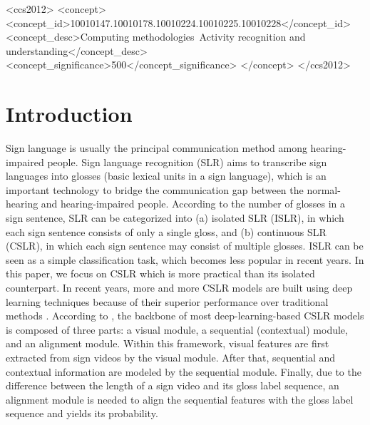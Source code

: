 \documentclass[acmsmall,screen]{acmart}
\begin{document}
\begin{CCSXML}
<ccs2012>
<concept>
<concept_id>10010147.10010178.10010224.10010225.10010228</concept_id>
<concept_desc>Computing methodologies~Activity recognition and understanding</concept_desc>
<concept_significance>500</concept_significance>
</concept>
</ccs2012>
\end{CCSXML}



\maketitle

\section{Introduction}
\label{sec:intro}
Sign language is usually the principal communication method among hearing-impaired people.
Sign language recognition (SLR) aims to transcribe sign languages into glosses (basic lexical units in a sign language), which is an important technology to bridge the communication gap between the normal-hearing and hearing-impaired people.
According to the number of glosses in a sign sentence, SLR can be categorized into (a) isolated SLR (ISLR), in which each sign sentence consists of only a single gloss, and (b) continuous SLR (CSLR), in which each sign sentence may consist of multiple glosses. 
ISLR can be seen as a simple classification task, which becomes less popular in recent years.
In this paper, we focus on CSLR which is more practical than its isolated counterpart.
In recent years, more and more CSLR models are built using deep learning techniques because of their superior performance over traditional methods \cite{stmc, vac, sfl}.
According to \cite{sfl}, the backbone of most deep-learning-based CSLR models is composed of three parts: a visual module, a sequential (contextual) module, and an alignment module.
Within this framework, visual features are first extracted from sign videos by the visual module.
After that, sequential and contextual information are modeled by the sequential module.
Finally, due to the difference between the length of a sign video and its gloss label sequence, an alignment module is needed to align the sequential features with the gloss label sequence and yields its probability.
\end{document}
